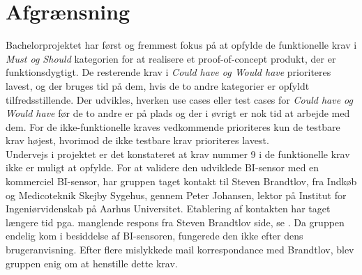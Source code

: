 \chapter{Afgrænsning}
Bachelorprojektet har først og fremmest fokus på at opfylde de funktionelle krav i \textit{Must og Should} kategorien for at realisere et proof-of-concept produkt, der er funktionsdygtigt. De resterende krav i \textit{Could have og Would have} prioriteres lavest, og der bruges tid på dem, hvis de to andre kategorier er opfyldt tilfredsstillende. Der udvikles, hverken use cases eller test cases for \textit{Could have og Would have} før de to andre er på plads og der i øvrigt er nok tid at arbejde med dem. For de ikke-funktionelle kraves vedkommende prioriteres kun de testbare krav højest, hvorimod de ikke testbare krav prioriteres lavest. \\


Undervejs i projektet er det konstateret at krav nummer 9 i de funktionelle krav ikke er muligt at opfylde. For at validere den udviklede BI-sensor med en kommerciel BI-sensor, har gruppen taget kontakt til Steven Brandtlov, fra Indkøb og Medicoteknik Skejby Sygehus, gennem  Peter Johansen, lektor på Institut for Ingeniørvidenskab på Aarhus Universitet. Etablering af kontakten har taget længere tid pga. manglende respons fra Steven Brandtlov side, se . Da gruppen endelig kom i besiddelse af BI-sensoren,  fungerede den ikke efter dens brugeranvisning. Efter flere mislykkede mail korrespondance med Brandtlov, blev gruppen enig om at henstille dette krav.      